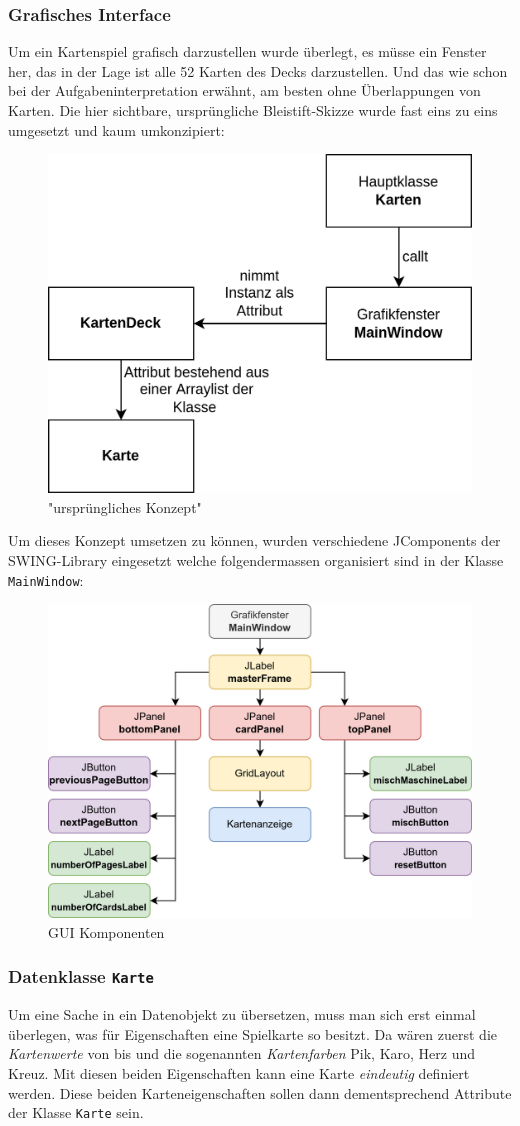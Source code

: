 \documentclass[a4paper,11pt]{article}
\begin{document}
\subsubsection{Grafisches Interface}

Um ein Kartenspiel grafisch darzustellen wurde überlegt, es müsse ein Fenster her, das in der Lage ist alle 52 Karten des Decks darzustellen. Und das wie schon bei der Aufgabeninterpretation erwähnt, am besten ohne Überlappungen von Karten. Die hier sichtbare, ursprüngliche Bleistift-Skizze wurde fast eins zu eins umgesetzt und kaum umkonzipiert:

\begin{figure}[H]
    \centering
    \includegraphics[width=.4\textwidth]{media/grober-ansatz.png}
    \caption{"ursprüngliches Konzept"}
\end{figure}

Um dieses Konzept umsetzen zu können, wurden verschiedene JComponents der SWING-Library eingesetzt welche folgendermassen organisiert sind in der Klasse \texttt{MainWindow}:

\begin{figure}[H]
    \centering
    \includegraphics[width=.7\textwidth]{media/gui-overview.png}
    \caption{GUI Komponenten}
\end{figure}

\subsubsection{Datenklasse \texttt{Karte}}
Um eine Sache in ein Datenobjekt zu übersetzen, muss man sich erst einmal überlegen, was für Eigenschaften eine Spielkarte so besitzt. Da wären zuerst die \textit{Kartenwerte} von  bis  und die sogenannten \textit{Kartenfarben} Pik, Karo, Herz und Kreuz. Mit diesen beiden Eigenschaften kann eine Karte \textit{eindeutig} definiert werden. Diese beiden Karteneigenschaften sollen dann dementsprechend Attribute der Klasse \texttt{Karte} sein.\\
\end{document}
